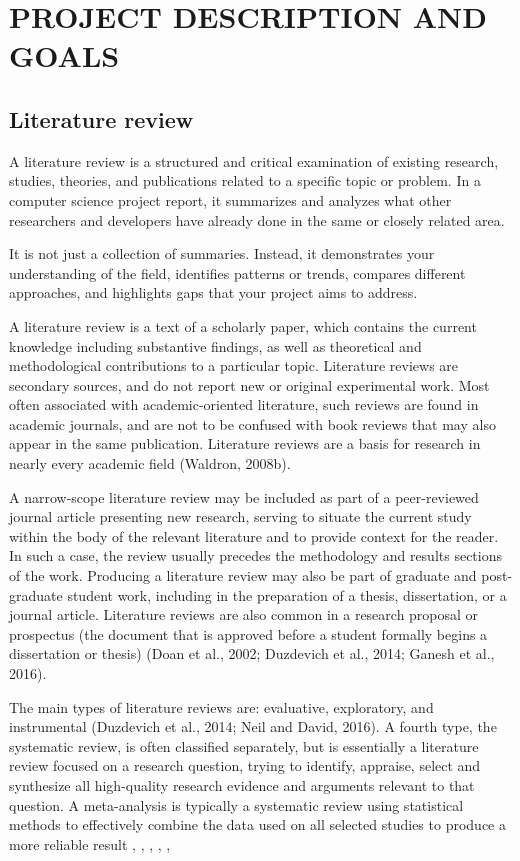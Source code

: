 \chapter{\MakeUppercase{Project Description and Goals}}
\section{Literature review}
A literature review is a structured and critical examination of existing research, studies, theories, and publications related to a specific topic or problem. In a computer science project report, it summarizes and analyzes what other researchers and developers have already done in the same or closely related area.

It is not just a collection of summaries. Instead, it demonstrates your understanding of the field, identifies patterns or trends, compares different approaches, and highlights gaps that your project aims to address.

A literature review is a text of a scholarly paper, which contains the current knowledge including substantive findings, as well as theoretical and methodological contributions to a particular topic. Literature reviews are secondary sources, and do not report new or 
original experimental work. Most often associated with  academic-oriented literature, such reviews are found in academic journals, and are not to be confused with book reviews that may also appear in the same publication. Literature reviews are a basis for research in nearly every academic field (Waldron, 2008b). 

A narrow-scope literature review may be included as part of a peer-reviewed journal article  presenting new research, serving to situate the current study within the body of the relevant 
literature and to provide context for the reader. In such a case, the review usually precedes the methodology and results sections of the work. Producing a literature review may also be part of graduate and post-graduate student work, including in the preparation of a thesis, 
dissertation, or a journal article. Literature reviews are also common in a research proposal or prospectus (the document that is approved before a student formally begins a dissertation or thesis) (Doan et al., 2002; Duzdevich et al., 2014; Ganesh et al., 2016).

The main types of literature reviews are: evaluative, exploratory, and instrumental (Duzdevich et al., 2014; Neil and David, 2016). 
A fourth type, the systematic review, is often classified separately, but is essentially a literature review focused on a research question, trying to identify, appraise, select and synthesize all high-quality research evidence and arguments relevant to that question. A meta-analysis is typically a systematic review using statistical methods to effectively 
combine the data used on all selected studies to produce a more reliable result \cite{duzdevich2014dna}, \cite{mohanaprasad2017optimized}, \cite{gilbarg1977elliptic}, \cite{haykin2004kalman}, \cite{haykin2005cognitive}, \cite{knuth1986computers}

